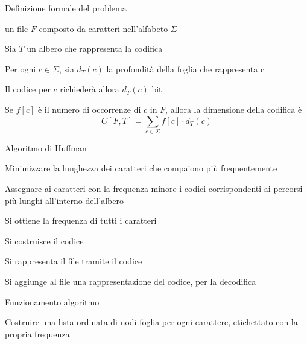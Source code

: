 \begin{frame}{Definizione formale del problema}

\BI
\item un file $F$ composto da caratteri nell'alfabeto $\Sigma$
\EI

\medskip
{}
\BI
\item Sia $T$ un albero che rappresenta la codifica
\item Per ogni $c \in \Sigma$, sia $d_T(c)$ la profondità della foglia che rappresenta c
\item Il codice per $c$ richiederà allora $d_T(c)$ bit
\item Se $f[c]$ è il numero di occorrenze di  $c$ in $F$, allora la dimensione della codifica è 
\[
  C[F,T] = \sum_{c \in \Sigma} f[c] \cdot d_T(c)
\]
\EI

\end{frame}

\begin{frame}{Algoritmo di Huffman}
\BIL
\item Minimizzare la lunghezza dei caratteri che compaiono più frequentemente
\item Assegnare ai caratteri con la frequenza minore i codici corrispondenti ai percorsi più lunghi all'interno dell'albero
\EIL

\medskip
{}
\BIL
\item Si ottiene la frequenza di tutti i caratteri
\item Si costruisce il codice
\item Si rappresenta il file tramite il codice
\item Si aggiunge al file una rappresentazione del codice, per la decodifica
\EIL
\end{frame}

\begin{frame}[fragile]{Funzionamento algoritmo}

\vspace{-6pt}
\begin{block}{}
\BI
\item Costruire una lista ordinata di nodi foglia per ogni carattere, etichettato con la propria frequenza
\EI
\end{block}

\medskip
{}
\end{frame}


